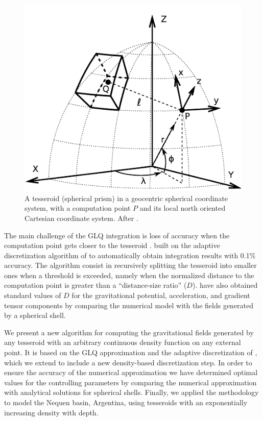 \documentclass[extra]{gji}
\begin{document}
\begin{figure}
\centering
\includegraphics[width=0.9\linewidth]{figures/tesseroid-uieda.pdf}
\caption{
    A tesseroid (spherical prism) in a geocentric spherical coordinate system, with a
    computation point $P$ and its local north oriented Cartesian coordinate system.
    After \citet{Uieda2015}.
}
\label{fig:tesseroid}
\end{figure}

The main challenge of the GLQ integration is loss of accuracy when the computation point
gets closer to the tesseroid \citep{Ku1977}.
\citet{Uieda2016} built on the adaptive discretization algorithm of \citet{Li2011}
to automatically obtain integration results with 0.1\% accuracy.
The algorithm consist in recursively splitting the tesseroid into smaller ones when a
threshold is exceeded,
namely when the normalized distance to the computation point is greater than a
``distance-size ratio'' ($D$).
\citet{Uieda2016} have also obtained standard values of $D$
for the gravitational potential, acceleration, and gradient tensor components
by comparing the numerical model with the fields generated by a spherical shell.

We present a new algorithm for computing the gravitational fields generated by any
tesseroid with an arbitrary continuous density function on any external point.
It is based on the GLQ approximation and the adaptive discretization of
\citet{Uieda2016}, which we extend to include a new density-based discretization step.
In order to ensure the accuracy of the numerical approximation we have
determined optimal values for the controlling parameters by
comparing the numerical approximation with analytical solutions for
spherical shells.
Finally, we applied the methodology to model the Nequen basin, Argentina, using
tesseroids with an exponentially increasing density with depth.
\end{document}
